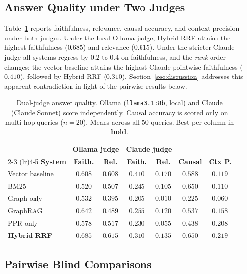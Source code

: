 \documentclass[10pt,a4paper]{article}
\begin{document}
\subsection{Answer Quality under Two Judges}

Table~\ref{tab:answer-quality} reports faithfulness, relevance,
causal accuracy, and context precision under both judges. Under the
local Ollama judge, Hybrid RRF attains the highest faithfulness
($0.685$) and relevance ($0.615$). Under the stricter Claude judge
all systems regress by $0.2$ to $0.4$ on faithfulness, and the
\emph{rank} order changes: the vector baseline attains the highest
Claude pointwise faithfulness ($0.410$), followed by Hybrid RRF
($0.310$). Section~\ref{sec:discussion} addresses this apparent
contradiction in light of the pairwise results below.

\begin{table}[t]
\centering
\small
\caption{Dual-judge answer quality. Ollama
(\texttt{llama3.1:8b}, local) and Claude (Claude Sonnet) score
independently. Causal accuracy is scored only on multi-hop queries
($n = 20$). Means across all $50$ queries. Best per column in
\textbf{bold}.}
\label{tab:answer-quality}
\begin{tabular}{lcccccc}
\toprule
& \multicolumn{2}{c}{\textbf{Ollama judge}} & \multicolumn{2}{c}{\textbf{Claude judge}} & & \\
\cmidrule(lr){2-3} \cmidrule(lr){4-5}
\textbf{System} & \textbf{Faith.} & \textbf{Rel.} & \textbf{Faith.} & \textbf{Rel.} & \textbf{Causal} & \textbf{Ctx P.} \\
\midrule
Vector baseline  & $0.608$ & $0.608$ & $\mathbf{0.410}$ & $\mathbf{0.170}$ & $0.588$ & $0.119$ \\
BM25             & $0.520$ & $0.507$ & $0.245$ & $0.105$ & $\mathbf{0.650}$ & $0.110$ \\
Graph-only       & $0.532$ & $0.395$ & $0.205$ & $0.010$ & $0.225$ & $0.060$ \\
GraphRAG         & $0.642$ & $0.489$ & $0.255$ & $0.120$ & $0.537$ & $0.158$ \\
PPR-only         & $0.578$ & $0.517$ & $0.230$ & $0.055$ & $0.438$ & $0.208$ \\
\textbf{Hybrid RRF} & $\mathbf{0.685}$ & $\mathbf{0.615}$ & $0.310$ & $0.135$ & $\mathbf{0.650}$ & $\mathbf{0.219}$ \\
\bottomrule
\end{tabular}
\end{table}

\subsection{Pairwise Blind Comparisons}
\end{document}
